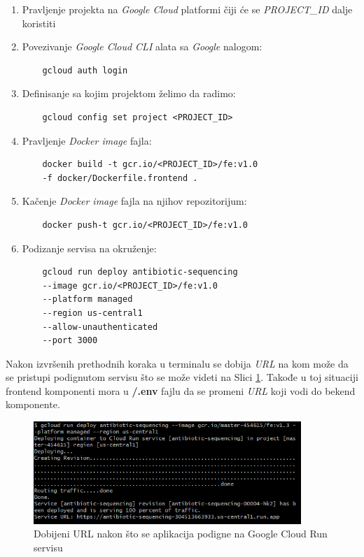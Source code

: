 \documentclass[12pt,oneside]{memoir}
\begin{document}
\begin{enumerate}
\item Pravljenje projekta na \emph{Google Cloud} platformi čiji će se \emph{PROJECT\_ID} dalje koristiti
\item Povezivanje \emph{Google Cloud CLI} alata sa \emph{Google} nalogom:
\begin{verbatim}
    gcloud auth login
\end{verbatim}
\item Definisanje sa kojim projektom želimo da radimo:
\begin{verbatim}
    gcloud config set project <PROJECT_ID>
\end{verbatim}
\item Pravljenje \emph{Docker image} fajla:
\begin{verbatim}
    docker build -t gcr.io/<PROJECT_ID>/fe:v1.0 
    -f docker/Dockerfile.frontend .
\end{verbatim}
\item Kačenje \emph{Docker image} fajla na njihov repozitorijum:
\begin{verbatim}
    docker push-t gcr.io/<PROJECT_ID>/fe:v1.0
\end{verbatim}
\item Podizanje servisa na okruženje: 
\begin{verbatim}
    gcloud run deploy antibiotic-sequencing 
    --image gcr.io/<PROJECT_ID>/fe:v1.0 
    --platform managed 
    --region us-central1
    --allow-unauthenticated 
    --port 3000
\end{verbatim}
\end{enumerate}

Nakon izvršenih prethodnih koraka u terminalu se dobija \emph{URL} na kom može da se pristupi podignutom servisu što se može videti na Slici \ref{fig:gcr_deploy}. Takođe u toj situaciji frontend komponenti mora u \textbf{/.env} fajlu da se promeni \emph{URL} koji vodi do bekend komponente.

\begin{figure}[h]
\centering
\includegraphics[width=0.9\textwidth]{images/gcr_deploy.png}
\caption{Dobijeni URL nakon što se aplikacija podigne na Google Cloud Run servisu}
\label{fig:gcr_deploy}
\end{figure}
\end{document}
